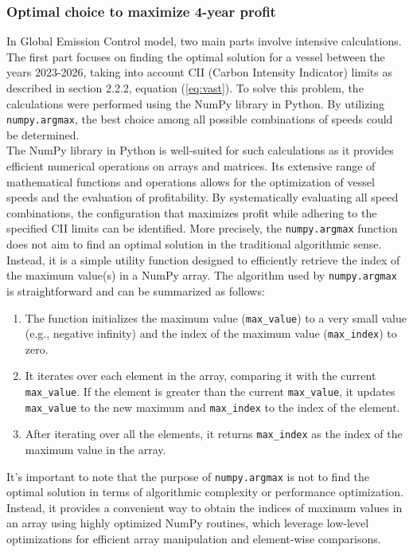 \documentclass[a4paper,12pt]{article}
\begin{document}
\subsubsection{Optimal choice to maximize 4-year profit}
In Global Emission Control model, two main parts involve intensive calculations.
The first part focuses on finding the optimal solution for a vessel between the years 2023-2026, taking into account CII (Carbon Intensity Indicator) limits as described in section 2.2.2, equation ({\ref{eq:vast}}).
To solve this problem, the calculations were performed using the NumPy library in Python.
By utilizing \texttt{numpy.argmax}, the best choice among all possible combinations of speeds could be determined.\\

The NumPy library in Python is well-suited for such calculations as it provides efficient numerical operations on arrays and matrices.
Its extensive range of mathematical functions and operations allows for the optimization of vessel speeds and the evaluation of profitability.
By systematically evaluating all speed combinations, the configuration that maximizes profit while adhering to the specified CII limits can be identified.
More precisely, the \texttt{numpy.argmax} function does not aim to find an optimal solution in the traditional algorithmic sense. Instead, it is a simple utility function designed to efficiently retrieve the index of the maximum value(s) in a NumPy array.
The algorithm used by \texttt{numpy.argmax} is straightforward and can be summarized as follows:

\begin{enumerate}
	\item The function initializes the maximum value (\texttt{max\_value}) to a very small value (e.g., negative infinity) and the index of the maximum value (\texttt{max\_index}) to zero.
	\item It iterates over each element in the array, comparing it with the current \texttt{max\_value}. If the element is greater than the current \texttt{max\_value}, it updates \texttt{max\_value} to the new maximum and \texttt{max\_index} to the index of the element.
	\item After iterating over all the elements, it returns \texttt{max\_index} as the index of the maximum value in the array.
\end{enumerate}

It's important to note that the purpose of \texttt{numpy.argmax} is not to find the optimal solution in terms of algorithmic complexity or performance optimization.
Instead, it provides a convenient way to obtain the indices of maximum values in an array using highly optimized NumPy routines, which leverage low-level optimizations for efficient array manipulation and element-wise comparisons.\\
\end{document}

